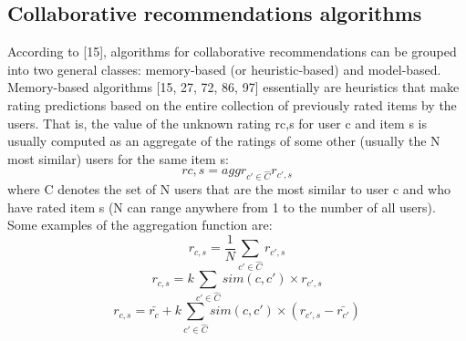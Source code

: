 \subsection{Collaborative recommendations algorithms}
According to [15], algorithms for collaborative recommendations can be grouped into two general classes: memory-based (or heuristic-based) and model-based. Memory-based algorithms [15, 27, 72, 86, 97] essentially are heuristics that make rating predictions based on the entire collection of previously rated items by the users. That is, the value of the unknown rating rc,s for user c and item s is usually computed as an aggregate of the ratings of some other (usually the N most similar) users for the same item s:
\begin{equation}\label{eq:9}
rc,s=aggr_{c'\in \hat{C}} r_{c',s} 
\end{equation}
where C denotes the set of N users that are the most similar to user c and who have rated item s (N can range anywhere from 1 to the number of all users). Some examples of the aggregation function are:
\begin{equation}\label{eq:10.a}
r_{c,s}= \frac{1}{N}\sum_{c' \in \hat{C}} r_{c',s} 
\end{equation}
\begin{equation}\label{eq:10.b}
r_{c,s}= k\sum_{ c'\in \hat{C}} sim(c,c')\times r_{c',s}
\end{equation}
\begin{equation}\label{eq:10.c}
r_{c,s}= \bar{r_c} + k\sum_{ c'\in \hat{C}} sim(c,c')\times (r_{c',s} - \bar{r_{c'}})
\end{equation}

